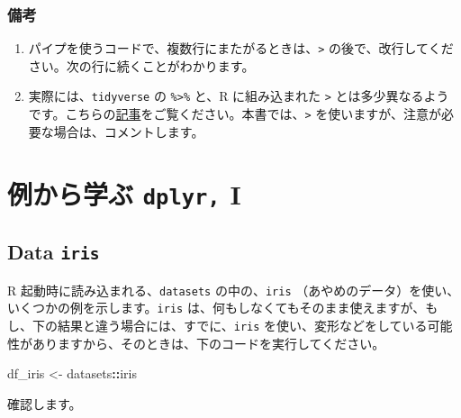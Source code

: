 \documentclass[
  xelatex, ja=standard]{bxjsbook}
\newenvironment{Shaded}{\begin{snugshade}}{\end{snugshade}}
\newcommand{\NormalTok}[1]{#1}
\newcommand{\OtherTok}[1]{\textcolor[rgb]{0.56,0.35,0.01}{#1}}
\newcommand{\SpecialCharTok}[1]{\textcolor[rgb]{0.81,0.36,0.00}{\textbf{#1}}}
\theoremstyle{definition}
\theoremstyle{definition}
\theoremstyle{definition}
\theoremstyle{definition}
\theoremstyle{remark}
\begin{document}
\hypertarget{ux5099ux8003-2}{%
\subsubsection{\texorpdfstring{\textbf{備考}}{備考}}\label{ux5099ux8003-2}}

\begin{enumerate}
\def\labelenumi{\arabic{enumi}.}
\item
  パイプを使うコードで、複数行にまたがるときは、\texttt{\textbar{}\textgreater{}} の後で、改行してください。次の行に続くことがわかります。
\item
  実際には、\texttt{tidyverse} の \texttt{\%\textgreater{}\%} と、R に組み込まれた \texttt{\textbar{}\textgreater{}} とは多少異なるようです。こちらの\href{https://www.tidyverse.org/blog/2023/04/base-vs-magrittr-pipe/}{記事}をご覧ください。本書では、\texttt{\textbar{}\textgreater{}} を使いますが、注意が必要な場合は、コメントします。
\end{enumerate}

\hypertarget{ux4f8bux304bux3089ux5b66ux3076-dplyr-i}{%
\section{\texorpdfstring{例から学ぶ \texttt{dplyr,} I}{例から学ぶ dplyr, I}}\label{ux4f8bux304bux3089ux5b66ux3076-dplyr-i}}

\hypertarget{data-iris}{%
\subsection{\texorpdfstring{Data \texttt{iris}}{Data iris}}\label{data-iris}}

R 起動時に読み込まれる、\texttt{datasets} の中の、\texttt{iris} （あやめのデータ）を使い、いくつかの例を示します。\texttt{iris} は、何もしなくてもそのまま使えますが、もし、下の結果と違う場合には、すでに、\texttt{iris} を使い、変形などをしている可能性がありますから、そのときは、下のコードを実行してください。

\begin{Shaded}
\begin{Highlighting}[]
\NormalTok{df\_iris }\OtherTok{\textless{}{-}}\NormalTok{ datasets}\SpecialCharTok{::}\NormalTok{iris}
\end{Highlighting}
\end{Shaded}

確認します。
\end{document}
